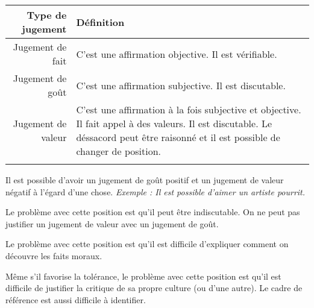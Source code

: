 \documentclass[11pt]{article}
\begin{document}
\begin{center}
\begin{tabularx}{\textwidth}{@{}rX@{}}
\hline
  \textbf{Type de jugement}
& \textbf{Définition}\\
\hline
  Jugement de fait
& C'est une affirmation objective. Il est vérifiable.\\
  Jugement de goût
& C'est une affirmation subjective. Il est discutable.\\
  Jugement de valeur
& C'est une affirmation à la fois subjective et objective. Il fait appel à des valeurs. Il est discutable. Le déssacord peut être raisonné et il est possible de changer de position.\\
\hline\\
\end{tabularx}
\end{center}

Il est possible d'avoir un jugement de goût positif et un jugement de valeur négatif à l'égard d'une chose. \textit{Exemple : Il est possible d'aimer un artiste pourrit.}


Le problème avec cette position est qu'il peut être indiscutable. On ne peut pas justifier un jugement de valeur avec un jugement de goût. 


Le problème avec cette position est qu'il est difficile d'expliquer comment on découvre les faits moraux.


Même s'il favorise la tolérance, le problème avec cette position est qu'il est difficile de justifier la critique de sa propre culture (ou d'une autre). Le cadre de référence est aussi difficile à identifier.\pagebreak

\end{document}
